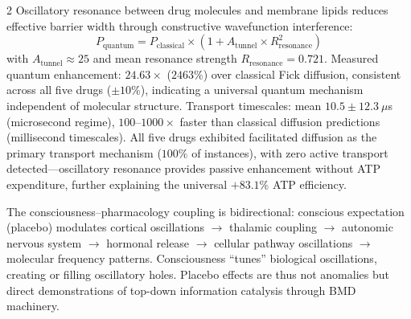 \begin{multicols}{2}
Oscillatory resonance between drug molecules and membrane lipids reduces
effective barrier width through constructive wavefunction interference:
\begin{equation}
P_{\text{quantum}} = P_{\text{classical}}
  \times\!\left(1 + A_{\text{tunnel}} \times R_{\text{resonance}}^2\right)
\label{eq:quantum_transport}
\end{equation}
with $A_{\text{tunnel}} \approx 25$ and mean resonance strength
$R_{\text{resonance}} = 0.721$.  Measured quantum enhancement: $24.63\times$
($2463\%$) over classical Fick diffusion, consistent across all five drugs
($\pm10\%$), indicating a universal quantum mechanism independent of
molecular structure.  Transport timescales: mean $10.5\pm12.3~\mu$s
(microsecond regime), $100$--$1000\times$ faster than classical diffusion
predictions (millisecond timescales).  All five drugs exhibited facilitated
diffusion as the primary transport mechanism ($100\%$ of instances), with
zero active transport detected---oscillatory resonance provides passive
enhancement without ATP expenditure, further explaining the universal
$+83.1\%$ ATP efficiency.

The consciousness--pharmacology coupling is bidirectional: conscious
expectation (placebo) modulates cortical oscillations $\to$ thalamic
coupling $\to$ autonomic nervous system $\to$ hormonal release $\to$
cellular pathway oscillations $\to$ molecular frequency patterns.
Consciousness ``tunes'' biological oscillations, creating or filling
oscillatory holes.  Placebo effects are thus not anomalies but direct
demonstrations of top-down information catalysis through BMD machinery.

\end{multicols}

